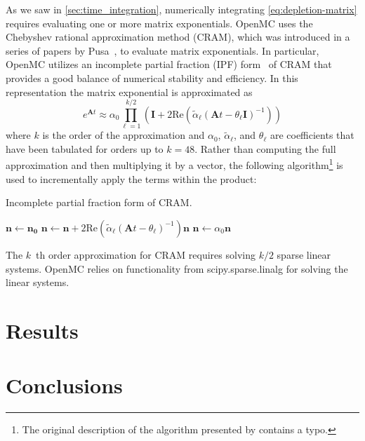 \documentclass[3p,authoryear]{elsarticle}
\begin{document}
As we saw in \cref{sec:time_integration}, numerically integrating
\cref{eq:depletion-matrix} requires evaluating one or more matrix exponentials.
OpenMC uses the Chebyshev rational approximation method (CRAM), which was
introduced in a series of papers by Pusa~\citep{pusa2010nse,pusa2011nse}, to
evaluate matrix exponentials. In particular, OpenMC utilizes an incomplete
partial fraction (IPF) form~\citep{pusa2016nse} of CRAM that provides a good
balance of numerical stability and efficiency. In this representation the matrix
exponential is approximated as
\begin{equation}
    e^{\mathbf{A}t} \approx \alpha_0 \prod\limits_{\ell=1}^{k/2} \left (
    \mathbf{I} + 2 \text{Re} \left ( \widetilde{\alpha}_\ell \left (\mathbf{A}t
    - \theta_\ell \mathbf{I} \right )^{-1} \right ) \right )
\end{equation}
where $k$ is the order of the approximation and $\alpha_0$,
$\widetilde{\alpha}_\ell$, and $\theta_\ell$ are coefficients that have been
tabulated for orders up to $k=48$. Rather than computing the full approximation
and then multiplying it by a vector, the following algorithm\footnote{The
original description of the algorithm presented by \citet{pusa2016nse} contains
a typo.} is used to incrementally apply the terms within the product:
\begin{algorithm}[H]
  \caption{Incomplete partial fraction form of CRAM.}
  \label{alg:cram}
  \begin{algorithmic}[1]
    \State $\mathbf{n} \gets \mathbf{n_0}$
      \State $\mathbf{n} \gets \mathbf{n} + 2\text{Re}(\widetilde{\alpha}_\ell
        (\mathbf{A}t - \theta_\ell)^{-1})\mathbf{n}$
    \EndFor
    \State $\mathbf{n} \gets \alpha_0 \mathbf{n}$
  \end{algorithmic}
\end{algorithm}
The $k$\ th order approximation for CRAM requires solving $k/2$ sparse linear
systems. OpenMC relies on functionality from scipy.sparse.linalg for solving the
linear systems.


\section{Results}
\label{sec:results}


\section{Conclusions}
\end{document}
